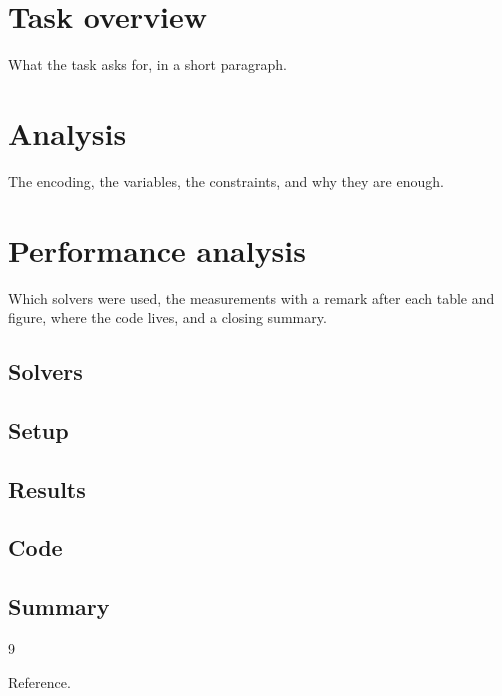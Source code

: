 \documentclass[11pt,a4paper]{article}
\begin{document}
\makereporttitle

\section{Task overview}

What the task asks for, in a short paragraph.

\section{Analysis}

The encoding, the variables, the constraints, and why they are enough.

\section{Performance analysis}

Which solvers were used, the measurements with a remark after each table and
figure, where the code lives, and a closing summary.

\subsection*{Solvers}

\subsection*{Setup}

\subsection*{Results}

\subsection*{Code}

\subsection*{Summary}

\begin{thebibliography}{9}

Reference.

\end{thebibliography}
\end{document}
